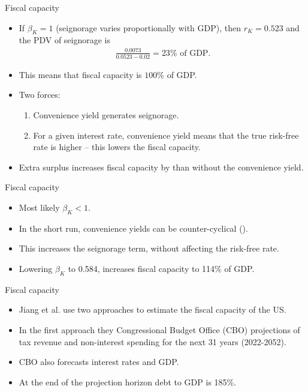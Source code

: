 \documentclass[11pt,xcolor={dvipsnames},aspectratio=159,hyperref={pdftex,pdfpagemode=UseNone,hidelinks,pdfdisplaydoctitle=true},usepdftitle=false]{beamer}
\begin{document}
   \begin{frame}{Fiscal capacity}
    \begin{itemize}
        \item If $\beta_K=1$ (seignorage varies proportionally with GDP), then $r_K = 0.523$ and the PDV of seignorage is \begin{align*}
            \frac{0.0073}{0.0523 - 0.02}=23\% \text{ of GDP}.
       \end{align*}
        \item This means that fiscal capacity is $100\%$ of GDP.
        \item Two  forces: 
        \begin{enumerate}
            \item Convenience yield generates seignorage.
            \item For a given interest rate, convenience yield means that the true risk-free rate is higher -- this lowers the fiscal capacity.
        \end{enumerate}
        \item Extra surplus increases fiscal capacity by  than without the convenience yield.
    \end{itemize}
   \end{frame}   

   \begin{frame}{Fiscal capacity}
    \begin{itemize}
        \item Most likely $\beta_K < 1$. 
        \item In the short run, convenience yields can be counter-cyclical ().
        \item This increases the seignorage term, without affecting the risk-free rate.
        \item Lowering $\beta_K$ to 0.584, increases fiscal capacity to 114\% of GDP.
    \end{itemize}
   \end{frame}   
  
 

   \begin{frame}{Fiscal capacity}
    \begin{itemize}
        \item Jiang et al. use two approaches to estimate the fiscal capacity of the US. 
        \item In the first approach they Congressional Budget Office (CBO) projections of tax revenue and non-interest spending for the next 31 years (2022-2052).
        \item CBO also forecasts interest rates and GDP.
        \item At the end of the projection horizon debt to GDP is 185\%.
    \end{itemize}
   \end{frame}   
\end{document}
